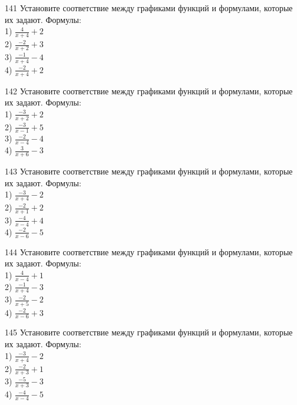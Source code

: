 \documentclass[4apaper]{article}
\begin{document}
\begin{taskBN}{141}
Установите соответствие между графиками функций и формулами, которые их задают. Формулы: \\1) $\frac{4}{x+4}+2$\\2) $\frac{-2}{x+2}+3$\\3) $\frac{-1}{x+4}-4$\\4) $\frac{-2}{x+4}+2$
\end{taskBN}

\begin{taskBN}{142}
Установите соответствие между графиками функций и формулами, которые их задают. Формулы: \\1) $\frac{-3}{x+2}+2$\\2) $\frac{-3}{x-1}+5$\\3) $\frac{-2}{x-4}-4$\\4) $\frac{3}{x+6}-3$
\end{taskBN}

\begin{taskBN}{143}
Установите соответствие между графиками функций и формулами, которые их задают. Формулы: \\1) $\frac{-3}{x+4}-2$\\2) $\frac{-2}{x+1}+2$\\3) $\frac{-4}{x-4}+4$\\4) $\frac{-2}{x-6}-5$
\end{taskBN}

\begin{taskBN}{144}
Установите соответствие между графиками функций и формулами, которые их задают. Формулы: \\1) $\frac{4}{x-4}+1$\\2) $\frac{-1}{x+4}-3$\\3) $\frac{-2}{x+5}-2$\\4) $\frac{-2}{x-6}+3$
\end{taskBN}

\begin{taskBN}{145}
Установите соответствие между графиками функций и формулами, которые их задают. Формулы: \\1) $\frac{-3}{x+4}-2$\\2) $\frac{-2}{x+3}+1$\\3) $\frac{-5}{x+3}-3$\\4) $\frac{-4}{x-4}-5$
\end{taskBN}
\end{document}
